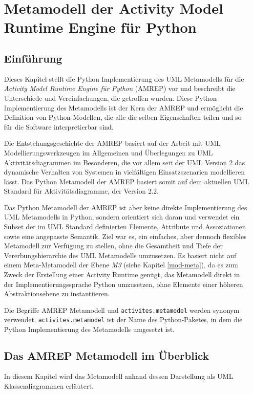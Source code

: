 \chapter{Metamodell der Activity Model Runtime Engine für Python}\label{amrep-metamodel}

\section{Einführung}\label{amrep-metamodel-intro}
Dieses Kapitel stellt die Python Implementierung des UML Metamodells für die \emph{Activity Model Runtime Engine für Python} (AMREP) vor und beschreibt die Unterschiede und Vereinfachungen, die getroffen wurden. Diese Python Implementierung des Metamodells ist der Kern der AMREP und ermöglicht die Definition von Python-Modellen, die alle die selben Eigenschaften teilen und so für die Software interpretierbar sind.

Die Entstehungsgeschichte der AMREP basiert auf der Arbeit mit UML Modellierungswerkzeugen im Allgemeinen und Überlegungen zu UML Aktivitäts\-di\-a\-grammen im Besonderen, die vor allem seit der UML Version 2 das dynamische Verhalten von Systemen in vielfältigen Einsatzszenarien modellieren lässt. Das Python Metamodell der AMREP basiert somit auf dem aktuellen UML Standard für Aktivitätsdiagramme, der Version 2.2.

Das Python Metamodell der AMREP ist aber keine direkte Implementierung des UML Metamodells in Python, sondern orientiert sich daran und verwendet ein Subset der im UML Standard definierten Elemente, Attribute und Assoziationen sowie eine angepasste Semantik. Ziel war es, ein einfaches, aber dennoch flexibles Metamodell zur Verfügung zu stellen, ohne die Gesamtheit und Tiefe der Vererbungshierarchie des UML Metamodells umzusetzen. Es basiert nicht auf einem Meta-Metamodell der Ebene \emph{M3} (siehe Kapitel \ref{mod-meta}), da es zum Zweck der Erstellung einer Activity Runtime genügt, das Metamodell direkt in der Implementierungssprache Python umzusetzen, ohne Elemente einer höheren Abstraktionsebene zu instantiieren.

Die Begriffe AMREP Metamodell und \texttt{activites.metamodel} werden synonym verwendet. \texttt{activites.metamodel} ist der Name des Python-Paketes, in dem die Python Implementierung des Metamodells umgesetzt ist.


\section{Das AMREP Metamodell im Überblick}
In diesem Kapitel wird das Metamodell anhand dessen Darstellung als UML Klassendiagrammen erläutert.

